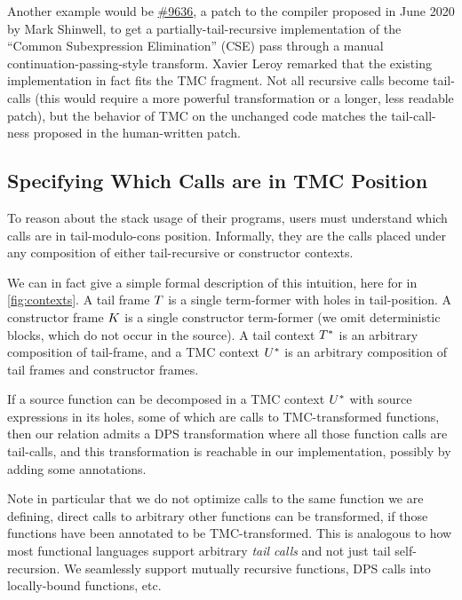 Another example would be \href{https://github.com/ocaml/ocaml/pull/9636}{\#9636}, a patch to the \OCaml compiler proposed in June 2020 by Mark Shinwell, to get a partially-tail-recursive implementation of the ``Common Subexpression Elimination'' (CSE) pass through a manual continuation-passing-style transform.
Xavier Leroy remarked that the existing implementation in fact fits the TMC fragment. Not all recursive calls become tail-calls (this would require a more powerful transformation or a longer, less readable patch), but the behavior of TMC on the unchanged code matches the tail-call-ness proposed in the human-written patch.

\subsection{Specifying Which Calls are in TMC Position} \label{subsec:specification}
To reason about the stack usage of their programs, users must understand which calls are in tail-modulo-cons position.
Informally, they are the calls placed under any composition of either tail-recursive or constructor contexts.

We can in fact give a simple formal description of this intuition, here for \DataLang in \cref{fig:contexts}.
A tail frame $\datalangTailFrame$ is a single term-former with holes in tail-position.
A constructor frame $\datalangConsFrame$ is a single constructor term-former (we omit deterministic blocks, which do not occur in the source).
A tail context $\datalangTailCtx$ is an arbitrary composition of tail-frame, and a TMC context $\datalangTMCCtx$ is an arbitrary composition of tail frames and constructor frames.

If a source function can be decomposed in a TMC context $\datalangTMCCtx$ with source expressions in its holes, some of which are calls to TMC-transformed functions, then our relation admits a DPS transformation where all those function calls are tail-calls, and this transformation is reachable in our \OCaml implementation, possibly by adding some annotations.

Note in particular that we do not optimize calls to the same function we are defining, direct calls to arbitrary other functions can be transformed, if those functions have been annotated to be TMC-transformed.
This is analogous to how most functional languages support arbitrary \emph{tail calls} and not just tail self-recursion.
We seamlessly support mutually recursive functions, DPS calls into locally-bound functions, etc.

